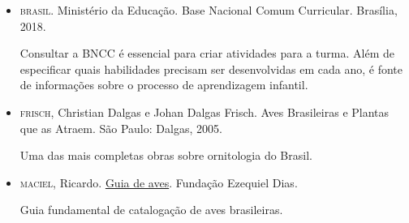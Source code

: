 \documentclass[11pt]{extarticle}
\begin{document}
\begin{itemize}

\item \textsc{brasil}. Ministério da Educação. Base Nacional Comum Curricular. Brasília, 2018.

Consultar a \textsc{BNCC} é essencial para criar atividades para a turma. Além de especificar 
quais habilidades precisam ser desenvolvidas em cada ano, é fonte de informações sobre 
o processo de aprendizagem infantil. 

\item \textsc{frisch}, Christian Dalgas e Johan Dalgas Frisch. Aves Brasileiras e Plantas que as Atraem. São Paulo: Dalgas, 2005.

Uma das mais completas obras sobre ornitologia do Brasil. 

\item \textsc{maciel}, Ricardo. \href{http://www.funed.mg.gov.br/wp-content/uploads/2018/10/GUIA-DE-AVES-FUNED-Vers\%C3\%A3o-Net_final.pdf}{Guia de aves}. Fundação Ezequiel Dias.

Guia fundamental de catalogação de aves brasileiras.

\end{itemize}
\end{document}
